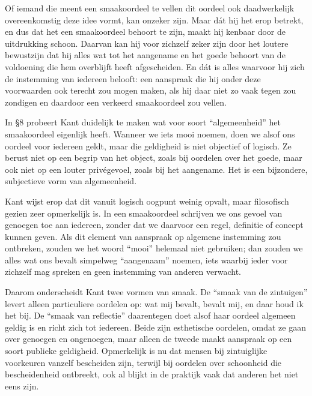 Of iemand die meent een smaakoordeel te vellen dit oordeel ook daadwerkelijk overeenkomstig deze idee vormt, kan onzeker zijn. Maar dát hij het erop betrekt, en dus dat het een smaakoordeel behoort te zijn, maakt hij kenbaar door de uitdrukking schoon. Daarvan kan hij voor zichzelf zeker zijn door het loutere bewustzijn dat hij alles wat tot het aangename en het goede behoort van de voldoening die hem overblijft heeft afgescheiden. En dát is alles waarvoor hij zich de instemming van iedereen belooft: een aanspraak die hij onder deze voorwaarden ook terecht zou mogen maken, als hij daar niet zo vaak tegen zou zondigen en daardoor een verkeerd smaakoordeel zou vellen.

\begin{mdframed}[leftmargin=0pt,rightmargin=0pt,backgroundcolor=blue!6,linecolor=white,innertopmargin=6pt,innerbottommargin=6pt]

In §8 probeert Kant duidelijk te maken wat voor soort “algemeenheid” het smaakoordeel eigenlijk heeft. Wanneer we iets mooi noemen, doen we alsof ons oordeel voor iedereen geldt, maar die geldigheid is niet objectief of logisch. Ze berust niet op een begrip van het object, zoals bij oordelen over het goede, maar ook niet op een louter privégevoel, zoals bij het aangename. Het is een bijzondere, subjectieve vorm van algemeenheid.

Kant wijst erop dat dit vanuit logisch oogpunt weinig opvalt, maar filosofisch gezien zeer opmerkelijk is. In een smaakoordeel schrijven we ons gevoel van genoegen toe aan iedereen, zonder dat we daarvoor een regel, definitie of concept kunnen geven. Als dit element van aanspraak op algemene instemming zou ontbreken, zouden we het woord “mooi” helemaal niet gebruiken; dan zouden we alles wat ons bevalt simpelweg “aangenaam” noemen, iets waarbij ieder voor zichzelf mag spreken en geen instemming van anderen verwacht.

Daarom onderscheidt Kant twee vormen van smaak. De “smaak van de zintuigen” levert alleen particuliere oordelen op: wat mij bevalt, bevalt mij, en daar houd ik het bij. De “smaak van reflectie” daarentegen doet alsof haar oordeel algemeen geldig is en richt zich tot iedereen. Beide zijn esthetische oordelen, omdat ze gaan over genoegen en ongenoegen, maar alleen de tweede maakt aanspraak op een soort publieke geldigheid. Opmerkelijk is nu dat mensen bij zintuiglijke voorkeuren vanzelf bescheiden zijn, terwijl bij oordelen over schoonheid die bescheidenheid ontbreekt, ook al blijkt in de praktijk vaak dat anderen het niet eens zijn.


\end{mdframed}
